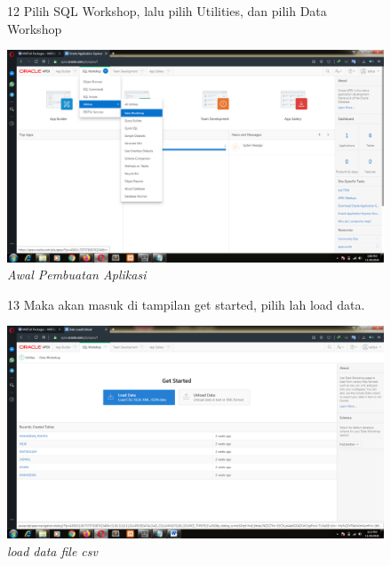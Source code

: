 \begin{enumerate}
\begin{figure}[!htbp]
\item[12] Pilih SQL Workshop, lalu pilih Utilities, dan pilih Data Workshop
	\begin{center}
	\includegraphics[scale=0.2]{figures/tahap11a.png}
	\caption{\textit{Awal Pembuatan Aplikasi}}
	\end{center}	 
\end{figure}

\begin{figure}[!htbp]
\item[13] Maka akan masuk di tampilan get started, pilih lah load data.
	\begin{center}
	\includegraphics[scale=0.2]{figures/tahap11b.png}
	\caption{\textit{load data file csv}}
	\end{center}	 
\end{figure}


\end{enumerate}
